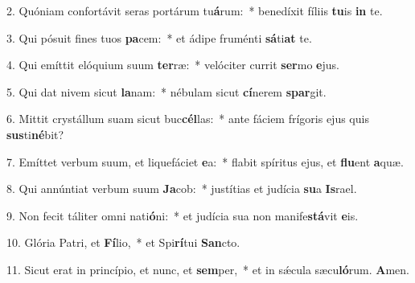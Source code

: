 \item 2. Quóniam confortávit seras portárum tu\textbf{á}rum:~* benedíxit fíliis \textbf{tu}is \textbf{in} te.
\item 3. Qui pósuit fines tuos \textbf{pa}cem:~* et ádipe fruménti \textbf{sá}ti\textbf{at} te.
\item 4. Qui emíttit elóquium suum \textbf{ter}ræ:~* velóciter currit \textbf{ser}mo \textbf{e}jus.
\item 5. Qui dat nivem sicut \textbf{la}nam:~* nébulam sicut \textbf{cí}nerem \textbf{spar}git.
\item 6. Mittit crystállum suam sicut buc\textbf{cél}las:~* ante fáciem frígoris ejus quis \textbf{sus}ti\textbf{né}bit?
\item 7. Emíttet verbum suum, et liquefáciet \textbf{e}a:~* flabit spíritus ejus, et \textbf{flu}ent \textbf{a}quæ.
\item 8. Qui annúntiat verbum suum \textbf{Ja}cob:~* justítias et judícia \textbf{su}a \textbf{Is}rael.
\item 9. Non fecit táliter omni nati\textbf{ó}ni:~* et judícia sua non manife\textbf{stá}vit \textbf{e}is.
\item 10. Glória Patri, et \textbf{Fí}lio,~* et Spi\textbf{rí}tui \textbf{San}cto.
\item 11. Sicut erat in princípio, et nunc, et \textbf{sem}per,~* et in sǽcula sæcu\textbf{ló}rum. \textbf{A}men.

